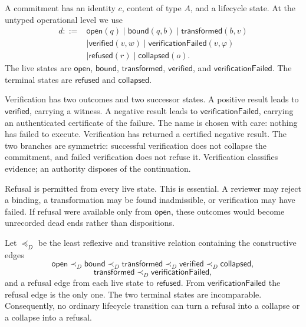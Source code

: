 \documentclass[11pt,openany]{book}
\theoremstyle{remark}
\begin{document}
A commitment has an identity $c$, content of type $A$, and a lifecycle
state. At the untyped operational level we use
\[
\begin{aligned}
d ::= {}& \mathsf{open}(q)
\mid \mathsf{bound}(q,b)
\mid \mathsf{transformed}(b,v)\\
&\mid \mathsf{verified}(v,w)
\mid \mathsf{verificationFailed}(v,\varphi)\\
&\mid \mathsf{refused}(r)
\mid \mathsf{collapsed}(o).
\end{aligned}
\]
The live states are $\mathsf{open}$, $\mathsf{bound}$,
$\mathsf{transformed}$, $\mathsf{verified}$, and
$\mathsf{verificationFailed}$. The terminal states are $\mathsf{refused}$
and $\mathsf{collapsed}$.

Verification has two outcomes and two successor states. A positive result
leads to $\mathsf{verified}$, carrying a witness. A negative result leads to
$\mathsf{verificationFailed}$, carrying an authenticated certificate of
the failure. The name is chosen with care: nothing has failed to execute.
Verification has returned a certified negative result. The two branches are
symmetric: successful verification does not collapse the commitment, and
failed verification does not refuse it. Verification classifies evidence;
an authority disposes of the continuation.

Refusal is permitted from every live state. This is essential. A reviewer
may reject a binding, a transformation may be found inadmissible, or
verification may have failed. If refusal were available only from
$\mathsf{open}$, these outcomes would become unrecorded dead ends rather
than dispositions.

Let $\preceq_D$ be the least reflexive and transitive relation containing
the constructive edges
\[
\mathsf{open}\prec_D\mathsf{bound}
\prec_D\mathsf{transformed}
\prec_D\mathsf{verified}
\prec_D\mathsf{collapsed},
\]
\[
\mathsf{transformed}\prec_D\mathsf{verificationFailed},
\]
and a refusal edge from each live state to $\mathsf{refused}$. From
$\mathsf{verificationFailed}$ the refusal edge is the only one. The two
terminal states are incomparable. Consequently, no ordinary lifecycle
transition can turn a refusal into a collapse or a collapse into a refusal.
\end{document}

